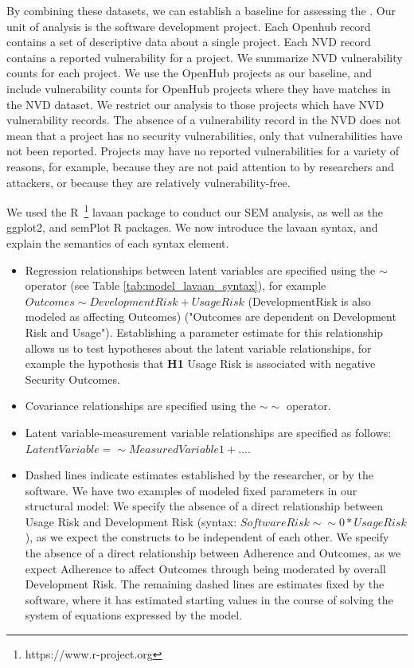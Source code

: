 By combining these datasets, we can establish a baseline for assessing the \ModelAbbr.
Our unit of analysis is the software development project. Each Openhub record contains a set of descriptive data about a single project. Each NVD record contains a reported vulnerability for a project. We summarize NVD vulnerability counts for each project. We use the OpenHub projects as our baseline, and include vulnerability counts for OpenHub projects where they have matches in the NVD dataset. We restrict our analysis to those projects which have NVD vulnerability records. The absence of a vulnerability record in the NVD does not mean that a project has no security vulnerabilities, only that vulnerabilities have not been reported. Projects may have no reported vulnerabilities for a variety of reasons, for example, because they are not paid attention to by researchers and attackers, or because they are relatively vulnerability-free. 

We used the R~\footnote{https://www.r-project.org} lavaan package to conduct our SEM analysis, as well as the ggplot2, and semPlot R packages. We now introduce the lavaan syntax, and explain the semantics of each syntax element.

\begin{itemize}
\item Regression relationships between latent variables are specified using the $\sim$  operator (see Table \ref{tab:model_lavaan_syntax}), for example $Outcomes \sim DevelopmentRisk + UsageRisk$ (DevelopmentRisk is also modeled as affecting Outcomes) ("Outcomes are dependent on Development Risk and Usage"). Establishing a parameter estimate for this relationship allows us to test hypotheses about the latent variable relationships, for example the hypothesis that \textbf{H1} Usage Risk is associated with negative Security Outcomes.
 \item Covariance relationships are specified using the $\sim\sim$ operator.
\item Latent variable-measurement variable relationships are specified as follows: $LatentVariable =\sim MeasuredVariable1 + ...$. 
\item Dashed lines indicate estimates established by the researcher, or by the software. We have two examples of modeled fixed parameters in our structural model: We specify the absence of a direct relationship between Usage Risk and Development Risk (syntax: $SoftwareRisk \sim\sim 0*UsageRisk$), as we expect the constructs to be independent of each other. We specify the absence of a direct relationship between Adherence and Outcomes, as we expect Adherence to affect Outcomes through being moderated by overall Development Risk. The remaining dashed lines are estimates fixed by the software, where it has estimated starting values in the course of solving the system of equations expressed by the model.
\end{itemize}

